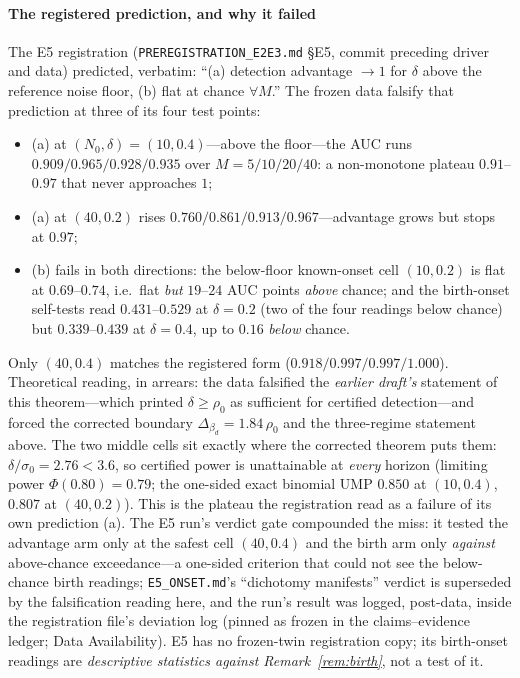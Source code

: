\paragraph{The registered prediction, and why it failed}
The E5 registration (\texttt{PREREGISTRATION\_E2E3.md} \S E5, commit
preceding driver and data) predicted, verbatim: ``(a) detection advantage
$\to1$ for $\delta$ above the reference noise floor, (b) flat at chance
$\forall M$.'' The frozen data falsify that prediction at three of its
four test points:
\begin{itemize}[leftmargin=1.6em,itemsep=1pt,topsep=2pt]
\item (a) at $(N_0,\delta)=(10,0.4)$---above the floor---the AUC runs
$0.909/0.965/0.928/0.935$ over $M=5/10/20/40$: a non-monotone plateau
$0.91$--$0.97$ that never approaches $1$;
\item (a) at $(40,0.2)$ rises $0.760/0.861/0.913/0.967$---advantage grows
but stops at $0.97$;
\item (b) fails in both directions: the below-floor known-onset cell
$(10,0.2)$ is flat at $0.69$--$0.74$, i.e.\ flat \emph{but} $19$--$24$
AUC points \emph{above} chance; and the birth-onset self-tests read
$0.431$--$0.529$ at $\delta=0.2$ (two of the four readings below chance)
but $0.339$--$0.439$ at $\delta=0.4$, up to $0.16$ \emph{below} chance.
\end{itemize}
Only $(40,0.4)$ matches the registered form
($0.918/0.997/0.997/1.000$). Theoretical reading, in arrears: the data
falsified the \emph{earlier draft's} statement of this theorem---which
printed $\delta\ge\rho_0$ as sufficient for certified detection---and
forced the corrected boundary $\Delta_{\beta_d}=1.84\,\rho_0$ and the
three-regime statement above. The two middle cells sit exactly where the
corrected theorem puts them: $\delta/\sigma_0=2.76<3.6$, so certified
power is unattainable at \emph{every} horizon (limiting power
$\Phi(0.80)=0.79$; the one-sided exact binomial UMP $0.850$ at $(10,0.4)$,
$0.807$ at $(40,0.2)$). This is the plateau the
registration read as a failure of its own prediction (a). The E5 run's
verdict gate compounded the miss: it tested the advantage arm only at the
safest cell $(40,0.4)$ and the birth arm only \emph{against}
above-chance exceedance---a one-sided criterion that could not see the
below-chance birth readings; \texttt{E5\_ONSET.md}'s ``dichotomy
manifests'' verdict is superseded by the falsification reading here, and
the run's result was logged, post-data, inside the registration file's
deviation log (pinned as frozen in the claims--evidence ledger; Data
Availability). E5 has no frozen-twin registration copy; its birth-onset
readings are \emph{descriptive statistics against
Remark~\ref{rem:birth}}, not a test of it.


